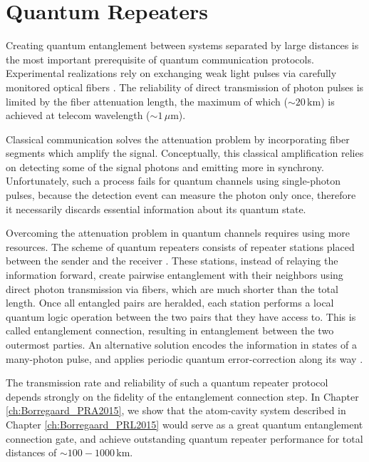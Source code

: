 \section{Quantum Repeaters}
Creating quantum entanglement between systems separated by
large distances is the most important prerequisite of quantum communication
protocols. Experimental realizations rely on exchanging weak light pulses
via carefully monitored optical fibers \cite{Peev2009}. The
reliability of direct transmission of photon pulses is limited by the
fiber attenuation length, the maximum of which ($\sim 20\,\mathrm{km}$) is
achieved at telecom wavelength ($\sim 1\,\mu\mathrm{m}$).

Classical communication solves the attenuation problem by incorporating fiber
segments which amplify the signal. Conceptually, this classical amplification
relies on detecting some of the signal photons and emitting more in synchrony.
Unfortunately, such a process fails for quantum channels using single-photon
pulses, because the detection event can measure the photon only once,
therefore it necessarily discards essential information about its quantum state.

Overcoming the attenuation problem in quantum channels requires using more
resources. The scheme of quantum repeaters consists of repeater stations placed
between the sender and the receiver \cite{bennett2, bennett, duan3}.
These stations, instead of relaying the information forward, create pairwise
entanglement with their neighbors using direct photon transmission via 
fibers, which are much shorter than the total length. Once all entangled pairs
are heralded, each station performs a local quantum logic operation between the
two pairs that they have access to. This is called entanglement connection,
resulting in entanglement between the two outermost parties. An alternative solution 
encodes the information in states of a many-photon pulse, and applies periodic
quantum error-correction along its way \cite{Muralidharan2015}.

The transmission rate  and reliability of such a quantum repeater protocol
depends strongly on the fidelity of the entanglement connection step. In Chapter
\ref{ch:Borregaard_PRA2015}, we show that the atom-cavity system described
in Chapter \ref{ch:Borregaard_PRL2015} would serve as a great quantum
entanglement connection gate, and achieve outstanding quantum repeater
performance for total distances of $\sim 100-1000\,\mathrm{km}$.



